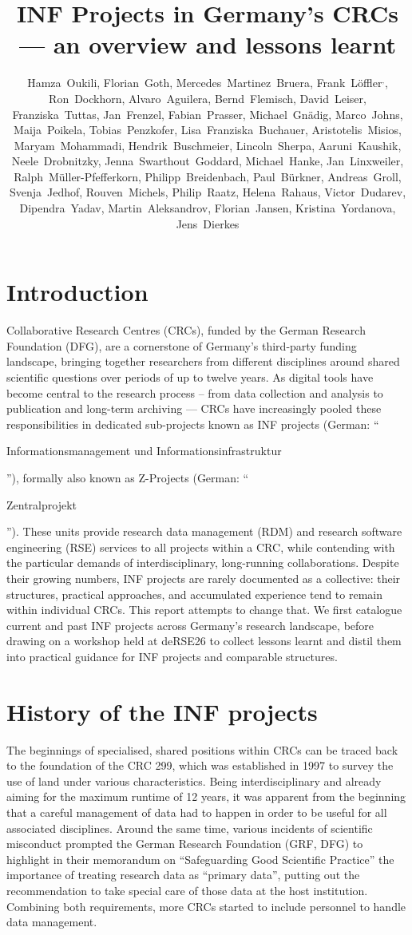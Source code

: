 \documentclass{eceasst}
\title{INF Projects in Germany's CRCs --- an overview and lessons learnt}
\author{
Hamza~Oukili\authorOrcid{0000-0003-4695-8532}\authorRef{1},
Florian~Goth\authorOrcid{0000-0003-2707-4790}\authorRef{2},
Mercedes~Martinez~Bruera\authorOrcid{0009-0004-2891-7045}\authorRef{3},
Frank~Löffler\authorOrcid{0000-0001-6643-6323}\authorRef{4}${}^,$\authorRef{5},
Ron~Dockhorn\authorOrcid{0000-0002-5268-5430}\authorRef{6},
Alvaro~Aguilera\authorOrcid{0000-0001-9324-8555}\authorRef{6},
Bernd~Flemisch\authorOrcid{0000-0001-8188-620X}\authorRef{1},
David~Leiser\authorOrcid{0000-0003-0949-8194}\authorRef{7},
Franziska~Tuttas\authorOrcid{0000-0003-3898-0908}\authorRef{7},
Jan~Frenzel\authorOrcid{0009-0007-5755-1427}\authorRef{6},
Fabian~Prasser\authorOrcid{0000-0003-3172-3095}\authorRef{8},
Michael~Gnädig\authorRef{8},
Marco~Johns\authorOrcid{0000-0003-4706-6595}\authorRef{8},
Maija~Poikela\authorOrcid{0000-0003-2616-4401}\authorRef{8}, 
Tobias~Penzkofer\authorOrcid{0000-0001-9591-8575}\authorRef{9}, 
Lisa~Franziska~Buchauer\authorOrcid{0000-0002-4722-8390}\authorRef{9},
Aristotelis~Misios\authorRef{9},
Maryam~Mohammadi\authorOrcid{0009-0007-8747-029X}\authorRef{10},
Hendrik~Buschmeier\authorOrcid{0000-0002-9613-5713}\authorRef{10},
Lincoln~Sherpa\authorOrcid{0009-0000-3287-0295}\authorRef{6},
Aaruni~Kaushik\authorOrcid{0009-0006-3061-6553}\authorRef{11},
Neele~Drobnitzky\authorOrcid{0000-0002-3181-941X}\authorRef{12},
Jenna~Swarthout~Goddard\authorOrcid{0000-0002-0181-0828}\authorRef{13},
Michael~Hanke\authorOrcid{0000-0001-6398-6370}\authorRef{13},
Jan~Linxweiler\authorOrcid{0000-0002-2755-5087}\authorRef{14},
Ralph~Müller-Pfefferkorn\authorOrcid{0000-0001-8719-5741}\authorRef{6},
Philipp~Breidenbach\authorOrcid{0000-0002-1506-7350}\authorRef{15},
Paul~Bürkner\authorOrcid{0000-0001-5765-8995}\authorRef{16},
Andreas~Groll\authorOrcid{0000-0001-6787-9118}\authorRef{16},
Svenja~Jedhof\authorOrcid{0009-0008-2939-9103}\authorRef{16},
Rouven~Michels\authorOrcid{0000-0002-5433-6197}\authorRef{16},
Philip~Raatz\authorOrcid{0000-0002-9133-0077}\authorRef{15},
Helena~Rahaus\authorOrcid{0009-0009-8843-8528}\authorRef{15},
Victor~Dudarev\authorOrcid{0000-0001-7243-9096}\authorRef{17},
Dipendra~Yadav\authorOrcid{0009-0004-4629-1277}\authorRef{18},
Martin~Aleksandrov\authorRef{19},
Florian~Jansen\authorOrcid{0000-0002-0331-5185}\authorRef{19},
Kristina~Yordanova\authorOrcid{0000-0002-6428-1062}\authorRef{18},
Jens~Dierkes\authorOrcid{0000-0002-0121-9261}\authorRef{20}
} %
\institute{%
\autlabel{1} Institute for Modeling Hydraulic and Environmental Systems (IWS), University of Stuttgart,
\autlabel{2} Institut für theoretische Physik 1, University of Würzburg,
\autlabel{3} Goethe-Universität Frankfurt am Main,
\autlabel{4} Heinz Nixdorf Chair for Distributed Information Systems, Friedrich Schiller University Jena,
\autlabel{5} de-RSE e.V. --- Society for Research Software in Germany,
\autlabel{6} Center for Interdisciplinary Digital Sciences, Technische Universität Dresden,
\autlabel{7} Institute of Space Systems (IRS), University of Stuttgart,
\autlabel{8} Berlin Institute of Health at Charité - Universitätsmedizin Berlin,
\autlabel{9} Charité - Universitätsmedizin Berlin,
\autlabel{10} Department of Linguistics, Bielefeld University, Bielefeld,
\autlabel{11} Fachbereich Mathematik, RPTU University Kaiserslautern-Landau, Kaiserslautern,
\autlabel{12} Heidelberg University Biochemistry Center (BZH), Heidelberg,
\autlabel{13} Forschungszentrum Jülich,
\autlabel{14} Technische Universität Braunschweig,
\autlabel{15} RWI - Leibniz Institute for Economic Research: Essen,
\autlabel{16} TU Dortmund University, Dortmund,
\autlabel{17} Materials Discovery and Interfaces (MDI), Ruhr University Bochum,
\autlabel{18} Institute of Data Science, University of Greifswald,
\autlabel{19} Faculty for Agriculture, Civil and Environmental Engineering, University of Rostock,
\autlabel{20} Universitäts- und Stadtbibliothek Köln, Universität zu Köln
}
\newenvironment{de}{\begin{otherlanguage}{ngerman}}{\end{otherlanguage}}
\begin{document}
\maketitle

\section{Introduction}

Collaborative Research Centres (CRCs), funded by the German Research Foundation (DFG), are a cornerstone of Germany's third-party funding landscape, bringing together researchers from different disciplines around shared scientific questions over periods of up to twelve years.
As digital tools have become central to the research process – from data collection and analysis to publication and long-term archiving — CRCs have increasingly pooled these responsibilities in dedicated sub-projects known as INF projects (German: “\begin{de}Informationsmanagement und Informationsinfrastruktur\end{de}”), formally also known as Z-Projects (German: “\begin{de}Zentralprojekt\end{de}”).
These units provide research data management (RDM) and research software engineering (RSE) services to all projects within a CRC, while contending with the particular demands of interdisciplinary, long-running collaborations.
Despite their growing numbers, INF projects are rarely documented as a collective: their structures, practical approaches, and accumulated experience tend to remain within individual CRCs.
This report attempts to change that.
We first catalogue current and past INF projects across Germany's research landscape, before drawing on a workshop held at deRSE26 to collect lessons learnt and distil them into practical guidance for INF projects and comparable structures.

\section{History of the INF projects}
\label{sec:history}
The beginnings of specialised, shared positions within CRCs can be traced back to the foundation of the CRC 299, which was established in 1997 to survey the use of land under various characteristics.
Being interdisciplinary and already aiming for the maximum runtime of 12 years, it was apparent from the beginning \cite{mueckschel2006} that a careful management of data had to happen in order to be useful for all associated disciplines.
Around the same time, various incidents of scientific misconduct prompted the German Research Foundation (GRF, DFG) to highlight in their
memorandum on ``Safeguarding Good Scientific Practice'' \cite{DFG1998}
the importance of treating research data as ``primary data'', putting out the recommendation to take special care of those data at the host institution.
Combining both requirements, more CRCs started to include personnel to handle data management.
\end{document}
